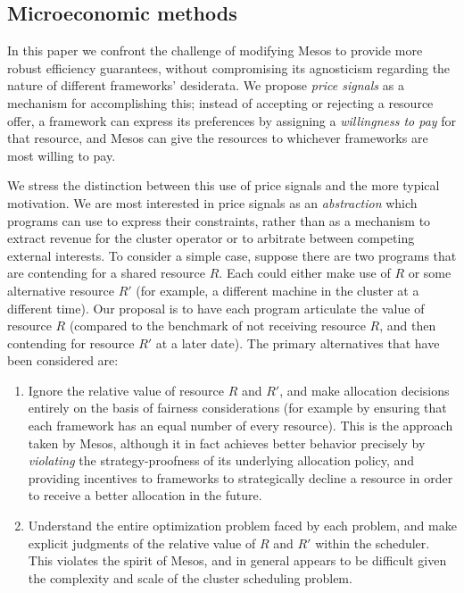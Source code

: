 \documentclass{acm_proc_article-sp}
\begin{document}
\subsection{Microeconomic methods}
In this paper we confront the challenge of modifying Mesos to provide more
robust efficiency guarantees, without compromising its agnosticism regarding the
nature of different frameworks' desiderata. We propose \emph{price signals} as a
mechanism for accomplishing this; instead of accepting or rejecting a resource
offer, a framework can express its preferences by assigning a \emph{willingness
to pay} for that resource, and Mesos can give the resources to whichever
frameworks are most willing to pay.

We stress the distinction between this use of price signals and the more typical
motivation. We are most interested in price signals as an \emph{abstraction} which
programs can use to express their constraints, rather than as a mechanism to
extract revenue for the cluster operator or to arbitrate between competing
external interests. To consider a simple case, suppose there are two programs
that are contending for a shared resource $R$. Each could either make use of $R$ or
some alternative resource $R'$ (for example, a different machine in the cluster at
a different time). Our proposal is to have each program articulate the value of
resource $R$ (compared to the benchmark of not receiving resource $R$, and then
contending for resource $R'$ at a later date). The primary alternatives that have
been considered are:
\vspace{-4mm}
\begin{enumerate}
\itemsep0em
  \item Ignore the relative value of resource $R$ and $R'$, and make allocation
    decisions entirely on the basis of fairness considerations (for example by
    ensuring that each framework has an equal number of every resource). This is
    the approach taken by Mesos, although it in fact achieves better behavior
    precisely by \emph{violating} the strategy-proofness of its underlying allocation
    policy, and providing incentives to frameworks to strategically decline a
    resource in order to receive a better allocation in the future.
  \item Understand the entire optimization problem faced by each problem, and
    make explicit judgments of the relative value of $R$ and $R'$ within the
    scheduler. This violates the spirit of Mesos, and in general appears to be
    difficult given the complexity and scale of the cluster scheduling problem.
\end{enumerate}
\end{document}

